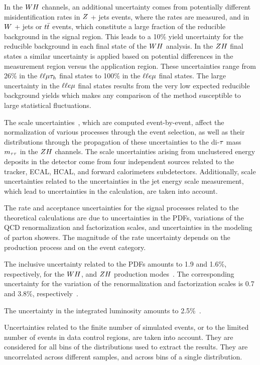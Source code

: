 In the $WH$ channels, an 
additional uncertainty comes from potentially different misidentification rates 
in $Z$ + jets events, where the rates are measured, and in $W$ + jets or 
$t\bar{t}$ events, which constitute a large fraction of the reducible background 
in the signal region. This leads to a 10\% yield uncertainty for the reducible 
background in each final state of the $WH$ analysis. In the $ZH$ final
states a similar uncertainty is applied based on potential differences in the
measurement region versus the application region. These uncertainties
range from 26\% in the $\ell\ell\mu\tau_{h}$ final states to 100\% in the
$\ell\ell e\mu$ final states. The large uncertainty in the $\ell\ell e\mu$ 
final states results from the very low expected reducible background yields 
which makes any comparison of the method susceptible to large statistical fluctuations.

The \etvecmiss scale uncertainties~\cite{CMS-JME-12-002}, which are computed 
event-by-event, affect the normalization of various processes through the event 
selection, as well as their distributions through the propagation of these 
uncertainties to the di-$\tau$ mass $m_{\tau\tau}$ in the $ZH$ channels. The 
\etvecmiss scale uncertainties arising from unclustered energy deposits in the 
detector come from four independent sources related to the tracker, ECAL, HCAL, 
and forward calorimeters subdetectors. Additionally, \etvecmiss scale 
uncertainties related to the uncertainties in the jet energy scale measurement, 
which lead to uncertainties in the \etvecmiss calculation, are taken into 
account. 

The rate and acceptance uncertainties for the signal processes related to the 
theoretical calculations are due to uncertainties in the PDFs, variations of 
the QCD renormalization and factorization scales, and uncertainties in the 
modeling of parton showers. The magnitude of the rate uncertainty depends on 
the production process and on the event category.

The inclusive uncertainty related to the PDFs amounts to 1.9 and 1.6\%, 
respectively, for the $WH$, and $ZH$ production modes~\cite{deFlorian:2016spz}. The
corresponding uncertainty for the variation of the renormalization and 
factorization scales is 0.7 and 3.8\%, respectively~\cite{deFlorian:2016spz}.

The uncertainty in the integrated luminosity amounts to 2.5\%~\cite{CMS-PAS-LUM-17-001}.

Uncertainties related to the finite number of simulated events, or to the 
limited number of events in data control regions, are taken into account. They 
are considered for all bins of the distributions used to extract the results.
They are uncorrelated across different samples, and across bins of a single distribution. 


